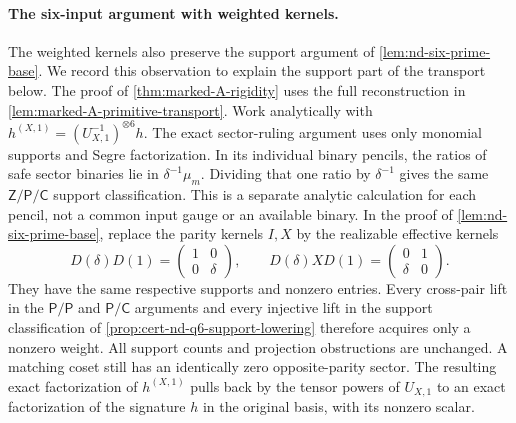 \documentclass[11pt,letterpaper,onecolumn]{article}
\theoremstyle{plain}
\theoremstyle{definition}
\theoremstyle{remark}
\begin{document}
\paragraph{The six-input argument with weighted kernels.}
\label{par:marked-A-six-base}
The weighted kernels also preserve the support argument of
\cref{lem:nd-six-prime-base}. We record this observation to explain the
support part of the transport below. The proof of
\cref{thm:marked-A-rigidity} uses the full reconstruction in
\cref{lem:marked-A-primitive-transport}.  Work analytically with
\(h^{(X,1)}=(U_{X,1}^{-1})^{\otimes6}h\).
The exact sector-ruling argument uses only monomial supports and
Segre factorization.  In its individual binary pencils, the ratios of safe sector binaries
lie in \(\delta^{-1}\mu_m\). Dividing that one ratio by
\(\delta^{-1}\) gives the same \(\mathsf Z/\mathsf P/\mathsf C\) support classification.
This is a separate analytic calculation for each pencil, not a common
input gauge or an available binary.  In the proof of \cref{lem:nd-six-prime-base}, replace the
parity kernels \(I,X\) by the realizable effective kernels
\[
 D(\delta) D(1)=\begin{pmatrix}1&0\\0&\delta\end{pmatrix},
 \qquad
 D(\delta) XD(1)=\begin{pmatrix}0&1\\\delta&0\end{pmatrix}.
\]
They have the same respective supports and nonzero entries.  Every
cross-pair lift in the \(\mathsf{P}/\mathsf{P}\) and \(\mathsf{P}/\mathsf{C}\) arguments and every
injective lift in the support classification of
\cref{prop:cert-nd-q6-support-lowering} therefore acquires only a nonzero
weight. All support counts and projection obstructions are unchanged.
A matching coset still has an identically zero opposite-parity sector.
The resulting exact factorization of \(h^{(X,1)}\) pulls back by
the tensor powers of \(U_{X,1}\) to an exact
factorization of the signature \(h\) in the original basis, with its nonzero scalar.  
\end{document}
